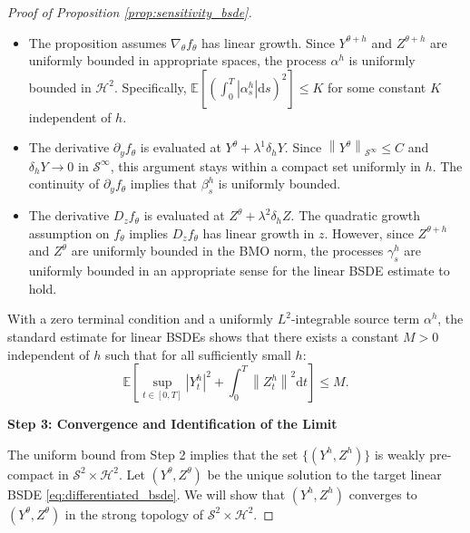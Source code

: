 \documentclass[qian]{imsart}
\newcommand{\E}{\mathbb{E}}
\newcommand{\dd}{\mathrm{d}}
\newcommand{\norm}[1]{\left\lVert#1\right\rVert}
\newcommand{\abs}[1]{\left\lvert#1\right\rvert}
\theoremstyle{plain}
\theoremstyle{definition}
\begin{document}
\begin{proof}[Proof of Proposition \ref{prop:sensitivity_bsde}]
\begin{itemize}
    \item The proposition assumes $\nabla_\theta f_\theta$ has linear growth. Since $Y^{\theta+h}$ and $Z^{\theta+h}$ are uniformly bounded in appropriate spaces, the process $\alpha^h$ is uniformly bounded in $\mathcal{H}^2$. Specifically, $\E[(\int_0^T \abs{\alpha^h_s} \dd s)^2] \le K$ for some constant $K$ independent of $h$.
    
    \item The derivative $\partial_y f_\theta$ is evaluated at $Y^\theta + \lambda^1 \delta_h Y$. Since $\norm{Y^\theta}_{\mathcal{S}^\infty} \le C$ and $\delta_h Y \to 0$ in $\mathcal{S}^\infty$, this argument stays within a compact set uniformly in $h$. The continuity of $\partial_y f_\theta$ implies that $\beta^h_s$ is uniformly bounded.
    
    \item The derivative $D_z f_\theta$ is evaluated at $Z^\theta + \lambda^2 \delta_h Z$. The quadratic growth assumption on $f_\theta$ implies $D_z f_\theta$ has linear growth in $z$. However, since $Z^{\theta+h}$ and $Z^\theta$ are uniformly bounded in the BMO norm, the processes $\gamma^h_s$ are uniformly bounded in an appropriate sense for the linear BSDE estimate to hold.
\end{itemize}
With a zero terminal condition and a uniformly $L^2$-integrable source term $\alpha^h$, the standard estimate for linear BSDEs shows that there exists a constant $M > 0$ independent of $h$ such that for all sufficiently small $h$:
\[ \E\left[\sup_{t \in [0,T]} \abs{Y^h_t}^2 + \int_0^T \norm{Z^h_t}^2 \dd t \right] \le M. \]

\textbf{Step 3: Convergence and Identification of the Limit}

The uniform bound from Step 2 implies that the set $\{(Y^h, Z^h)\}$ is weakly pre-compact in $\mathcal{S}^2 \times \mathcal{H}^2$. Let $(Y^\theta, Z^\theta)$ be the unique solution to the target linear BSDE \eqref{eq:differentiated_bsde}. We will show that $(Y^h, Z^h)$ converges to $(Y^\theta, Z^\theta)$ in the strong topology of $\mathcal{S}^2 \times \mathcal{H}^2$.


\end{proof}
\end{document}
